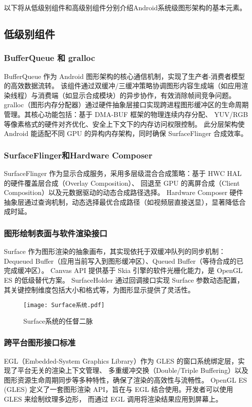 以下将从低级别组件和高级别组件分别介绍Android系统级图形架构的基本元素。

\subsection{低级别组件}

\subsubsection{BufferQueue 和 gralloc}
BufferQueue 作为 Android 图形架构的核心通信机制，实现了生产者-消费者模型的高效数据流转。
该组件通过双缓冲/三缓冲策略协调图形内容生成端（如应用渲染线程）与消费端（如显示合成模块）的异步协作，有效消除帧间竞争问题。
gralloc（图形内存分配器）通过硬件抽象层接口实现跨进程图形缓冲区的生命周期管理。其核心功能包括：基于 DMA-BUF 框架的物理连续内存分配、
YUV/RGB 等像素格式的硬件对齐优化、安全上下文下的内存访问权限控制。
此分层架构使 Android 能适配不同 GPU 的异构内存架构，同时确保 SurfaceFlinger 合成效率。

\subsubsection{SurfaceFlinger和Hardware Composer}
SurfaceFlinger 作为显示合成服务，采用多层级混合合成策略：基于 HWC HAL 的硬件覆盖层合成（Overlay Composition）、
回退至 GPU 的离屏合成（Client Composition）以及元数据驱动的动态合成路径选择。
Hardware Composer 硬件抽象层通过查询机制，动态选择最优合成路径（如视频层直接送显），显著降低合成时延。

\subsubsection{图形绘制表面与软件渲染接口}
Surface 作为图形渲染的抽象画布，其实现依托于双缓冲队列的同步机制：Dequeued Buffer（应用当前写入到图形缓冲区）、Queued Buffer（等待合成的已完成缓冲区）。
Canvas API 提供基于 Skia 引擎的软件光栅化能力，是 OpenGL ES 的低级替代方案。
SurfaceHolder 通过回调接口实现 Surface 参数动态配置，其关键控制维度包括大小和格式等，为图形显示提供了灵活性。

\begin{figure}[h]
  \centering
  \texttt{[image: Surface系统.pdf]}
  \caption{Surface系统的任督二脉\cite{邓凡平2011深入理解}}\label{fig:Surface系统的任督二脉}
\end{figure}


\subsubsection{跨平台图形接口标准}
EGL（Embedded-System Graphics Library）作为 GLES 的窗口系统绑定层，实现了平台无关的渲染上下文管理、
多重缓冲交换（Double/Triple Buffering）以及图形资源生命周期同步等多种特性，确保了渲染的高效性与流畅性。
OpenGL ES (GLES) 定义了一套图形渲染 API，旨在与 EGL 结合使用。开发者可以使用 GLES 来绘制纹理多边形，
而通过 EGL 调用将渲染结果应用到屏幕上。

